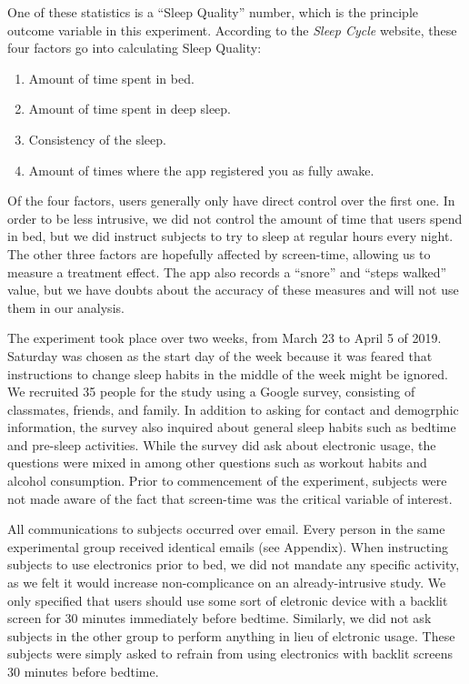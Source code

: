 \documentclass[]{article}
\providecommand{\tightlist}{%
  \setlength{\itemsep}{0pt}\setlength{\parskip}{0pt}}
\begin{document}
One of these statistics is a ``Sleep Quality'' number, which is the
principle outcome variable in this experiment. According to the
\emph{Sleep Cycle} website, these four factors go into calculating Sleep
Quality:

\begin{enumerate}
\def\labelenumi{\arabic{enumi}.}
\tightlist
\item
  Amount of time spent in bed.
\item
  Amount of time spent in deep sleep.
\item
  Consistency of the sleep.
\item
  Amount of times where the app registered you as fully awake.
\end{enumerate}

Of the four factors, users generally only have direct control over the
first one. In order to be less intrusive, we did not control the amount
of time that users spend in bed, but we did instruct subjects to try to
sleep at regular hours every night. The other three factors are
hopefully affected by screen-time, allowing us to measure a treatment
effect. The app also records a ``snore'' and ``steps walked'' value, but
we have doubts about the accuracy of these measures and will not use
them in our analysis.

The experiment took place over two weeks, from March 23 to April 5 of
2019. Saturday was chosen as the start day of the week because it was
feared that instructions to change sleep habits in the middle of the
week might be ignored. We recruited 35 people for the study using a
Google survey, consisting of classmates, friends, and family. In
addition to asking for contact and demogrphic information, the survey
also inquired about general sleep habits such as bedtime and pre-sleep
activities. While the survey did ask about electronic usage, the
questions were mixed in among other questions such as workout habits and
alcohol consumption. Prior to commencement of the experiment, subjects
were not made aware of the fact that screen-time was the critical
variable of interest.

All communications to subjects occurred over email. Every person in the
same experimental group received identical emails (see Appendix). When
instructing subjects to use electronics prior to bed, we did not mandate
any specific activity, as we felt it would increase non-complicance on
an already-intrusive study. We only specified that users should use some
sort of eletronic device with a backlit screen for 30 minutes
immediately before bedtime. Similarly, we did not ask subjects in the
other group to perform anything in lieu of elctronic usage. These
subjects were simply asked to refrain from using electronics with
backlit screens 30 minutes before bedtime.
\end{document}
